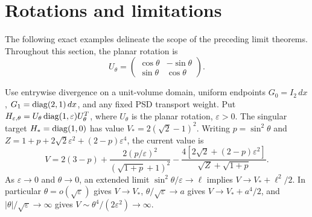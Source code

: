 \section{Rotations and limitations}\label{sec:examples}
The following exact examples delineate the scope of the preceding limit
theorems. Throughout this section, the planar rotation is
\[
 U_\theta=\begin{pmatrix}
 \cos\theta&-\sin\theta\\
 \sin\theta&\cos\theta
 \end{pmatrix}.
\]

\begin{proposition}\label{prop:reactionrotation}
Use entrywise divergence on a unit-volume domain, uniform endpoints
$G_0=I_2\,dx$, $G_1=\operatorname{diag}(2,1)\,dx$, and any fixed PSD transport weight. Put
$H_{\varepsilon,\theta}=U_\theta\operatorname{diag}(1,\varepsilon)U_\theta^T$,
where $U_\theta$ is the planar rotation, $\varepsilon>0$. The singular target
$H_* =\operatorname{diag}(1,0)$ has value $V_*=2(\sqrt2-1)^2$. Writing
$p=\sin^2\theta$ and $Z=1+p+2\sqrt2\varepsilon^2+(2-p)\varepsilon^4$,
the current value is
\begin{equation}\label{eq:rotationformula}
 V=2(3-p)+\frac{2(p/\varepsilon)^2}{(\sqrt{1+p}+1)^2}
 -\frac{4[2\sqrt2+(2-p)\varepsilon^2]}{\sqrt Z+\sqrt{1+p}}.
\end{equation}
As $\varepsilon\to0$ and $\theta\to0$, an extended limit
$\sin^2\theta/\varepsilon\to\ell$ implies $V\to V_*+\ell^2/2$.
In particular $\theta=o(\sqrt\varepsilon)$ gives $V\to V_*$,
$\theta/\sqrt\varepsilon\to a$ gives $V\to V_*+a^4/2$, and
$|\theta|/\sqrt\varepsilon\to\infty$ gives
$V\sim\theta^4/(2\varepsilon^2)\to\infty$.
\end{proposition}
